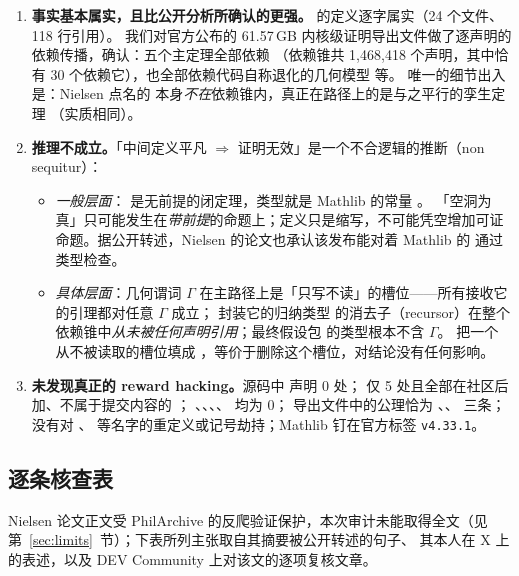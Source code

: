 \begin{verdictbox}
\begin{enumerate}[label=\textbf{A\arabic*.},leftmargin=3em]
\item \textbf{事实基本属实，且比公开分析所确认的更强。} 的定义逐字属实（24 个文件、118 行引用）。
我们对官方公布的 61.57\,GB 内核级证明导出文件做了逐声明的依赖传播，确认：五个主定理全部依赖 
（依赖锥共 1,468,418 个声明，其中恰有 30 个依赖它），也全部依赖代码自称退化的几何模型  等。
唯一的细节出入是：Nielsen 点名的  本身\emph{不在}依赖锥内，真正在路径上的是与之平行的孪生定理
（实质相同）。
\item \textbf{推理不成立。}「中间定义平凡 $\Rightarrow$ 证明无效」是一个不合逻辑的推断（non sequitur）：
  \begin{itemize}
  \item \emph{一般层面}： 是无前提的闭定理，类型就是 Mathlib 的常量 。
  「空洞为真」只可能发生在\emph{带前提}的命题上；定义只是缩写，不可能凭空增加可证命题。据公开转述，Nielsen 的论文也承认该发布能对着 Mathlib 的  通过类型检查。
  \item \emph{具体层面}：几何谓词 $\Gamma$ 在主路径上是「只写不读」的槽位——所有接收它的引理都对任意 $\Gamma$ 成立；
  封装它的归纳类型  的消去子（recursor）在整个依赖锥中\emph{从未被任何声明引用}；最终假设包  的类型根本不含 $\Gamma$。
  把一个从不被读取的槽位填成 ，等价于删除这个槽位，对结论没有任何影响。
  \end{itemize}
\item \textbf{未发现真正的 reward hacking。}源码中  声明 0 处； 仅 5 处且全部在社区后加、不属于提交内容的 ；
、、、、 均为 0；
导出文件中的公理恰为 、、 三条；
没有对 、 等名字的重定义或记号劫持；Mathlib 钉在官方标签 \texttt{v4.33.1}。
\conlecheSummary
\end{enumerate}
\end{verdictbox}

\subsection{逐条核查表}

Nielsen 论文正文受 PhilArchive 的反爬验证保护，本次审计未能取得全文（见第~\ref{sec:limits}~节）；下表所列主张取自其摘要被公开转述的句子、
其本人在 X 上的表述，以及 DEV Community 上对该文的逐项复核文章。

